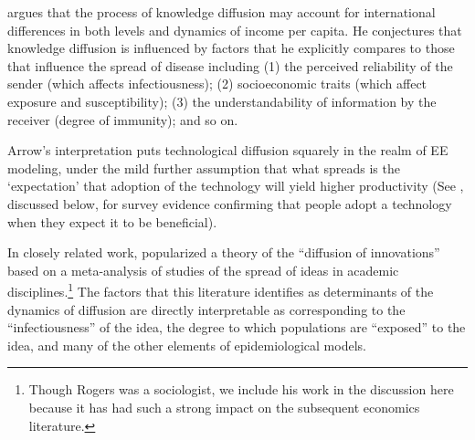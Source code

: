 \href{https://github.com/iworld1991/EpiExp/blob/master/Literature/arrow_classificatory_1969.pdf}{\cite{arrow_classificatory_1969}} argues that the process of knowledge diffusion may account for international differences in both levels and dynamics of income per capita. He conjectures that knowledge diffusion is influenced by factors that he explicitly compares to  those that influence the spread of disease including (1) the perceived reliability of the sender (which affects infectiousness); (2) socioeconomic traits (which affect exposure and susceptibility); (3) the understandability of information by the receiver (degree of immunity); and so on.

Arrow's interpretation puts technological diffusion squarely in the realm of EE modeling, under the mild further assumption that what spreads is the `expectation' that adoption of the technology will yield higher productivity (See \cite{banerjee2013diffusion}, discussed below, for survey evidence confirming that people adopt a technology when they expect it to be beneficial).

In closely related work, \href{https://en.wikipedia.org/wiki/Diffusion_of_innovations}{\cite{rogers1962diffusion}} popularized a theory of the ``diffusion of innovations'' based on a meta-analysis of studies of the spread of ideas in academic disciplines.\footnote{Though Rogers was a sociologist, we include his work in the discussion here because it has had such a strong impact on the subsequent economics literature.}  The factors that this literature identifies as determinants of the dynamics of diffusion are directly interpretable as corresponding to the ``infectiousness'' of the idea, the degree to which populations are ``exposed'' to the idea, and many of the other elements of epidemiological models.

